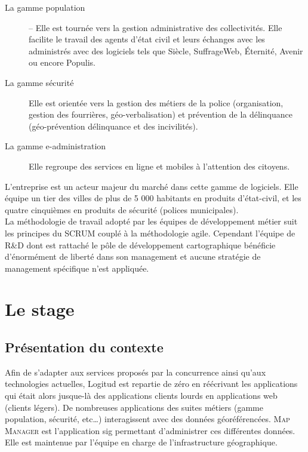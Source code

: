 \documentclass{rapportUHA40}
\begin{document}
\begin{description}
  \item[La gamme population] – Elle est tournée vers la gestion administrative des
    collectivités. Elle facilite le travail des agents d'état civil et leurs
    échanges avec les administrés avec des logiciels tels que Siècle, SuffrageWeb,
    Éternité, Avenir ou encore Populis.
  \item[La gamme sécurité] Elle est orientée vers la gestion des métiers de la police
    (organisation, gestion des fourrières, géo-verbalisation) et prévention de la
    délinquance (géo-prévention délinquance et des incivilités).
  \item[La gamme e-administration] Elle regroupe des services en ligne et mobiles à
    l'attention des citoyens.
\end{description}

L'entreprise est un acteur majeur du marché dans cette gamme de logiciels. Elle
équipe un tier des villes de plus de 5 000 habitants en produits d’état-civil,
et les quatre cinquièmes en produits de sécurité (polices municipales).\\

La méthodologie de travail adopté par les équipes de développement métier suit
les principes du \gls{SCRUM} couplé à la méthodologie \Gls{agile}. Cependant
l'équipe de R\&D dont est rattaché le pôle de développement cartographique
bénéficie d'énormément de liberté dans son management et aucune stratégie de
management spécifique n'est appliquée.

\newpage
\section{Le stage}
\subsection{Présentation du contexte}

Afin de s'adapter aux services proposés par la concurrence ainsi qu'aux
technologies actuelles, Logitud est repartie de zéro en réécrivant les
applications qui était alors jusque-là des applications clients lourds en
applications web (clients légers). De nombreuses applications des suites
métiers (gamme population, sécurité, etc\ldots) interagissent avec des données
géoréférencées. \textsc{Map Manager} est l'application \gls{sig} permettant
d’administrer ces différentes données. Elle est maintenue par l’équipe en
charge de l’infrastructure géographique.
\end{document}
